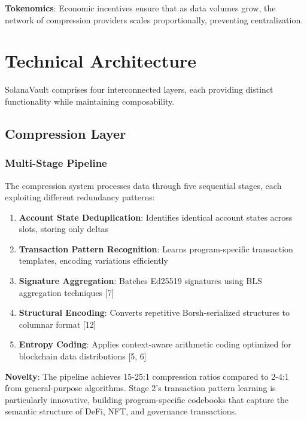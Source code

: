 \documentclass[12pt,a4paper]{article}
\begin{document}
\noindent\textbf{Tokenomics}: Economic incentives ensure that as data volumes grow, the network of compression providers scales proportionally, preventing centralization.

\section{Technical Architecture}

SolanaVault comprises four interconnected layers, each providing distinct functionality while maintaining composability.

\subsection{Compression Layer}

\subsubsection{Multi-Stage Pipeline}

The compression system processes data through five sequential stages, each exploiting different redundancy patterns:

\begin{enumerate}
    \item \textbf{Account State Deduplication}: Identifies identical account states across slots, storing only deltas
    \item \textbf{Transaction Pattern Recognition}: Learns program-specific transaction templates, encoding variations efficiently
    \item \textbf{Signature Aggregation}: Batches Ed25519 signatures using BLS aggregation techniques [7]
    \item \textbf{Structural Encoding}: Converts repetitive Borsh-serialized structures to columnar format [12]
    \item \textbf{Entropy Coding}: Applies context-aware arithmetic coding optimized for blockchain data distributions [5, 6]
\end{enumerate}

\noindent\textbf{Novelty}: The pipeline achieves 15-25:1 compression ratios compared to 2-4:1 from general-purpose algorithms. Stage 2's transaction pattern learning is particularly innovative, building program-specific codebooks that capture the semantic structure of DeFi, NFT, and governance transactions.
\end{document}
